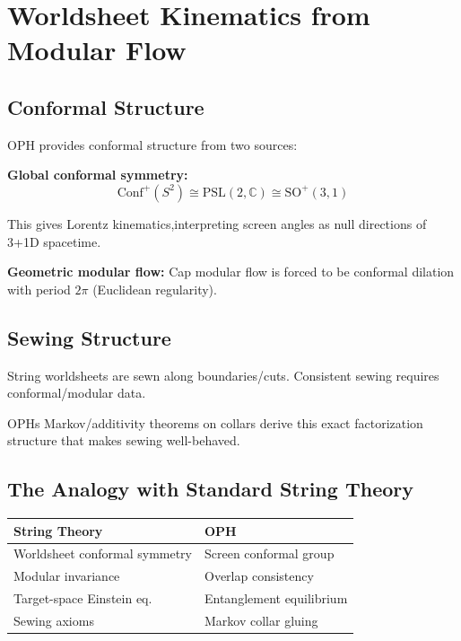 \section{Worldsheet Kinematics from Modular Flow}\label{6-worldsheet-kinematics-from-modular-flow}

\subsection{Conformal Structure}\label{61-conformal-structure}

OPH provides conformal structure from two sources:

\textbf{Global conformal symmetry:} \[\text{Conf}^+(S^2) \cong \text{PSL}(2,\mathbb{C}) \cong \text{SO}^+(3,1)\]

This gives Lorentz kinematics,interpreting screen angles as null directions of 3+1D spacetime.

\textbf{Geometric modular flow:} Cap modular flow is forced to be conformal dilation with period \(2\pi\) (Euclidean regularity).

\subsection{Sewing Structure}\label{62-sewing-structure}

String worldsheets are sewn along boundaries/cuts. Consistent sewing requires conformal/modular data.

OPH\textquotesingle s Markov/additivity theorems on collars derive this exact factorization structure that makes sewing well-behaved.

\subsection{The Analogy with Standard String Theory}\label{63-the-analogy-with-standard-string-theory}

{\def\LTcaptype{none} %
\begin{longtable}[]{@{}>{\RaggedRight\arraybackslash}p{}>{\RaggedRight\arraybackslash}p{}@{}}
\toprule\noalign{}
String Theory & OPH \\
\midrule\noalign{}
\endhead
\bottomrule\noalign{}
\endlastfoot
Worldsheet conformal symmetry & Screen conformal group \\
Modular invariance & Overlap consistency \\
Target-space Einstein eq. & Entanglement equilibrium \\
Sewing axioms & Markov collar gluing \\
\end{longtable}
}

